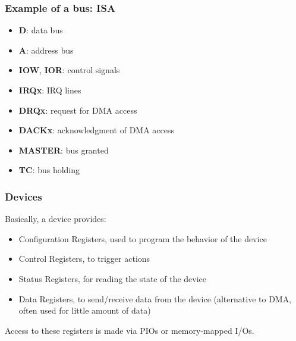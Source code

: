\begin{frame}
  \frametitle{Example of a bus: ISA}

  \begin{itemize}
  \item
    \textbf{D}: data bus
  \item
    \textbf{A}: address bus
  \item
    \textbf{IOW}, \textbf{IOR}: control signals
  \item
    \textbf{IRQx}: IRQ lines
  \item
    \textbf{DRQx}: request for DMA access
  \item
    \textbf{DACKx}: acknowledgment of DMA access
  \item
    \textbf{MASTER}: bus granted
  \item
    \textbf{TC}: bus holding
  \end{itemize}

\end{frame}


\begin{frame}
  \frametitle{Devices}

  Basically, a device provides:

  \begin{itemize}
  \item
    Configuration Registers, used to program the behavior of the device
  \item
    Control Registers, to trigger actions
  \item
    Status Registers, for reading the state of the device
  \item
    Data Registers, to send/receive data from the device (alternative
    to DMA, often used for little amount of data)
  \end{itemize}

  \-

  Access to these registers is made via PIOs or memory-mapped I/Os.

\end{frame}


